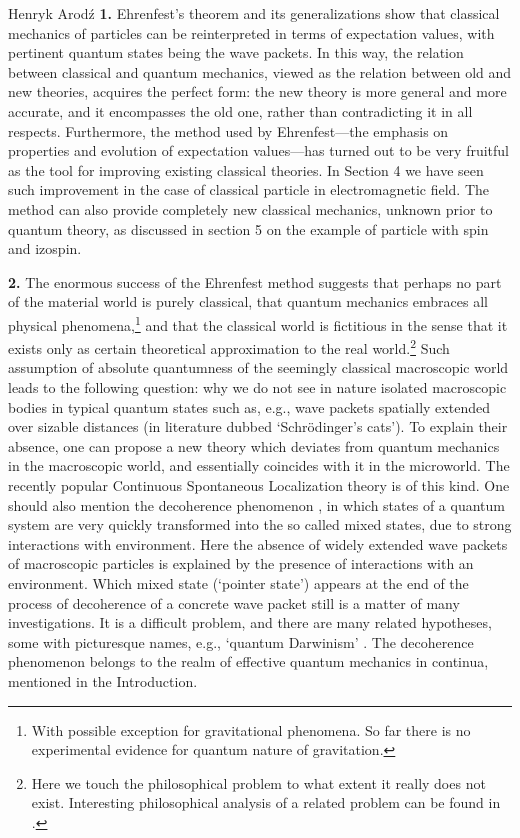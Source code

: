 \begin{artengenv}{Henryk Arod\'z}
{\bf 1.} Ehrenfest's theorem and its generalizations show that classical mechanics of particles can be reinterpreted in terms of expectation values, with pertinent quantum states being the wave packets. In this way, the relation between classical and quantum mechanics, viewed as the relation between old and new theories, acquires the perfect form: the new theory is more general and more accurate, and it
encompasses the old one, rather than contradicting
it in all respects. Furthermore, the method used by Ehrenfest---the emphasis on properties and evolution of expectation values---has turned out to be very fruitful as the tool for improving existing classical theories. In Section 4 we have seen such improvement in the case of classical particle in electromagnetic field. The method can also provide completely new classical mechanics, unknown prior to quantum theory, as discussed in section 5 on the example of particle with spin and izospin. 




{\bf 2.} The enormous success of the Ehrenfest method suggests that perhaps no part of the material world is purely classical, that quantum mechanics embraces all physical phenomena,\footnote{With possible exception for gravitational phenomena. So far there is no experimental evidence for quantum nature of gravitation.} and that the classical world is fictitious in the sense that it exists only as certain theoretical approximation to the real world.\footnote{Here we touch the philosophical problem to what extent it really does not exist. Interesting philosophical analysis of a related problem can be found in \parencite{heller}.}
 Such assumption of absolute quantumness of the seemingly classical macroscopic world leads to the following question: why we do not see in nature isolated macroscopic bodies in typical quantum states such as, e.g., wave packets spatially extended over sizable distances (in literature dubbed `Schr\"odinger's cats'). To explain their absence, one can propose a new theory which deviates from quantum mechanics in the macroscopic world, and essentially coincides with it in the microworld. The recently popular Continuous Spontaneous Localization theory \parencite{CSL} is of this kind. 
 One should also mention 
the decoherence phenomenon \parencite{zeh,zurek}, in which states of a quantum system are very quickly transformed into the so called mixed states, due to strong interactions with environment. Here the absence of widely extended wave packets of macroscopic particles is explained by the presence of interactions with an environment. Which mixed state (`pointer state') appears at the end of the process of decoherence of a concrete wave packet still is a matter of many investigations. It is a difficult problem, and there are many related hypotheses, some with picturesque names, e.g., `quantum Darwinism' \parencite{zurek2}. The decoherence phenomenon belongs to the realm of effective quantum mechanics in continua, mentioned in the Introduction. 



\end{artengenv}
